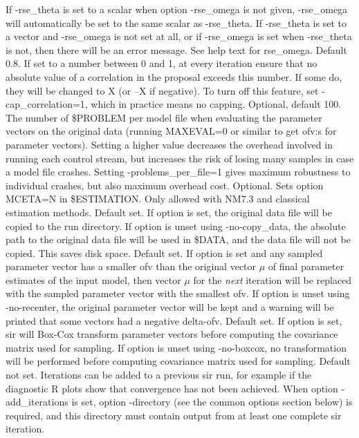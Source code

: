 \begin{optionlist}
If -rse\_theta is set to a scalar when option -rse\_omega is not given, -rse\_omega will 
automatically be set to the same scalar as -rse\_theta. If -rse\_theta is set to a vector and 
-rse\_omega is not set at all, or if -rse\_omega is set when -rse\_theta is not, then there will 
be an error message.
\nextopt
{}
See help text for rse\_omega.
\nextopt
{}
Default 0.8. If set to a number between 0 and 1, at every iteration 
ensure that no absolute value of a correlation in the proposal exceeds 
this number. If some do, they will be changed to X (or –X if negative).
To turn off this feature, set -cap\_correlation=1, which in practice
means no capping.
\nextopt
{}
Optional, default 100. The number of \$PROBLEM per model file when evaluating the parameter vectors
on the original data (running
MAXEVAL=0 or similar to get ofv:s for parameter vectors). Setting a higher value
decreases the overhead involved in running each control stream, but increases the 
risk of losing many samples in case a model file crashes. Setting -problems\_per\_file=1
gives maximum robustness to individual crashes, but also maximum overhead cost.
\nextopt
{}
Optional. Sets option MCETA=N in \$ESTIMATION. Only allowed with NM7.3 and classical estimation methods.
\nextopt
{}
Default set. If option is set, the original data file
will be copied to the run directory.
If option is unset using -no-copy\_data, the absolute path to the original data file will be used in
\$DATA, and the data file will not be copied. This saves disk space.
\nextopt
{}
Default set. If option is set and any sampled parameter vector has a smaller ofv than the original
vector $\mu$ of final parameter estimates of the input model, then vector $\mu$ for the \emph{next} iteration will be replaced with
the sampled parameter vector with the smallest ofv.
If option is unset using -no-recenter, the original parameter vector will be kept
and a warning will be printed that some vectors had a negative delta-ofv.
\nextopt
{}
Default set. 
If option is set, sir will Box-Cox transform parameter vectors before computing
the covariance matrix used for sampling.
If option is unset using -no-boxcox, no transformation will be performed before computing covariance matrix
used for sampling.
\nextopt
{}
Default not set. 
Iterations can be added to a previous sir run, for example if the diagnostic R plots show that
convergence has not been achieved. When option -add\_iterations is set, option -directory 
(see the common options section below) is required,
and this directory must contain output from at least one complete sir iteration.


\end{optionlist}
